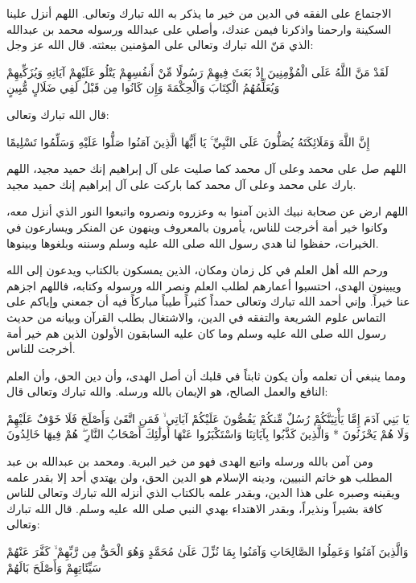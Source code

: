 الاجتماع على الفقه في الدين من خير ما يذكر به الله تبارك وتعالى. اللهم أنزل علينا السكينة وارحمنا واذكرنا فيمن عندك، وأصلي على عبدالله ورسوله محمد بن عبدالله الذي مَنّ الله تبارك وتعالى على المؤمنين ببعثته. قال الله عز وجل:

\begin{ayah}
لَقَدْ مَنَّ اللَّهُ عَلَى الْمُؤْمِنِينَ إِذْ بَعَثَ فِيهِمْ رَسُولًا مِّنْ أَنفُسِهِمْ يَتْلُو عَلَيْهِمْ آيَاتِهِ وَيُزَكِّيهِمْ وَيُعَلِّمُهُمُ الْكِتَابَ وَالْحِكْمَةَ وَإِن كَانُوا مِن قَبْلُ لَفِي ضَلَالٍ مُّبِينٍ
\end{ayah}

قال الله تبارك وتعالى:
\begin{ayah}
إِنَّ اللَّهَ وَمَلَائِكَتَهُ يُصَلُّونَ عَلَى النَّبِيِّ ۚ يَا أَيُّهَا الَّذِينَ آمَنُوا صَلُّوا عَلَيْهِ وَسَلِّمُوا تَسْلِيمًا
\end{ayah}

اللهم صل على محمد وعلى آل محمد كما صليت على آل إبراهيم إنك حميد مجيد، اللهم بارك على محمد وعلى آل محمد كما باركت على آل إبراهيم إنك حميد مجيد.

اللهم ارض عن صحابة نبيك الذين آمنوا به وعزروه ونصروه واتبعوا النور الذي أنزل معه، وكانوا خير أمة أخرجت للناس، يأمرون بالمعروف وينهون عن المنكر ويسارعون في الخيرات، حفظوا لنا هدي رسول الله صلى الله عليه وسلم وسننه وبلغوها وبينوها.

ورحم الله أهل العلم في كل زمان ومكان، الذين يمسكون بالكتاب ويدعون إلى الله ويبينون الهدى، احتسبوا أعمارهم لطلب العلم ونصر الله ورسوله وكتابه، فاللهم اجزهم عنا خيراً. وإني أحمد الله تبارك وتعالى حمداً كثيراً طيباً مباركاً فيه أن جمعني وإياكم على التماس علوم الشريعة والتفقه في الدين، والاشتغال بطلب القرآن وبيانه من حديث رسول الله صلى الله عليه وسلم وما كان عليه السابقون الأولون الذين هم خير أمة أخرجت للناس.

ومما ينبغي أن تعلمه وأن يكون ثابتاً في قلبك أن أصل الهدى، وأن دين الحق، وأن العلم النافع والعمل الصالح، هو الإيمان بالله ورسله. والله تبارك وتعالى قال:
\begin{ayah}
يَا بَنِي آدَمَ إِمَّا يَأْتِيَنَّكُمْ رُسُلٌ مِّنكُمْ يَقُصُّونَ عَلَيْكُمْ آيَاتِي ۙ فَمَنِ اتَّقَىٰ وَأَصْلَحَ فَلَا خَوْفٌ عَلَيْهِمْ وَلَا هُمْ يَحْزَنُونَ * وَالَّذِينَ كَذَّبُوا بِآيَاتِنَا وَاسْتَكْبَرُوا عَنْهَا أُولَٰئِكَ أَصْحَابُ النَّارِ ۖ هُمْ فِيهَا خَالِدُونَ
\end{ayah}

ومن آمن بالله ورسله واتبع الهدى فهو من خير البرية. ومحمد بن عبدالله بن عبد المطلب هو خاتم النبيين، ودينه الإسلام هو الدين الحق، ولن يهتدي أحد إلا بقدر علمه ويقينه وصبره على هذا الدين، وبقدر علمه بالكتاب الذي أنزله الله تبارك وتعالى للناس كافة بشيراً ونذيراً، وبقدر الاهتداء بهدي النبي صلى الله عليه وسلم. قال الله تبارك وتعالى:
\begin{ayah}
وَالَّذِينَ آمَنُوا وَعَمِلُوا الصَّالِحَاتِ وَآمَنُوا بِمَا نُزِّلَ عَلَىٰ مُحَمَّدٍ وَهُوَ الْحَقُّ مِن رَّبِّهِمْ ۙ كَفَّرَ عَنْهُمْ سَيِّئَاتِهِمْ وَأَصْلَحَ بَالَهُمْ
\end{ayah}

